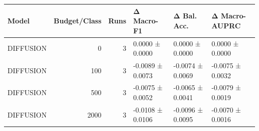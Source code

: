 \begin{tabular}{lrrlll}
\toprule
Model & Budget/Class & Runs & Δ Macro-F1 & Δ Bal. Acc. & Δ Macro-AUPRC \\
\midrule
DIFFUSION & 0 & 3 & 0.0000 ± 0.0000 & 0.0000 ± 0.0000 & 0.0000 ± 0.0000 \\
DIFFUSION & 100 & 3 & -0.0089 ± 0.0073 & -0.0074 ± 0.0069 & -0.0075 ± 0.0032 \\
DIFFUSION & 500 & 3 & -0.0075 ± 0.0052 & -0.0065 ± 0.0041 & -0.0079 ± 0.0019 \\
DIFFUSION & 2000 & 3 & -0.0108 ± 0.0106 & -0.0096 ± 0.0095 & -0.0070 ± 0.0016 \\
\bottomrule
\end{tabular}
